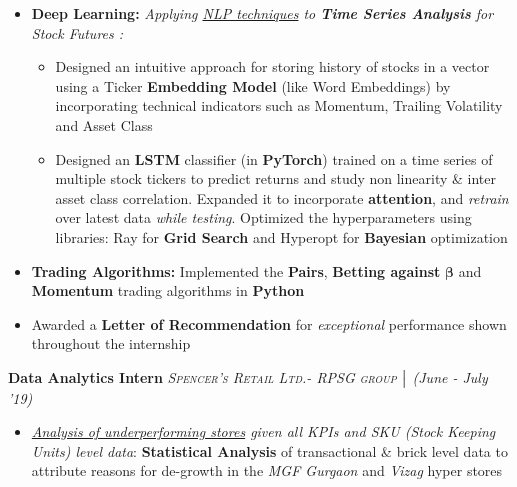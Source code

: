 \documentclass{article}
\begin{document}
\begin{itemize}[itemsep = -1 mm, leftmargin=*]
    \item \textbf{Deep Learning: }{\it Applying \underline{NLP techniques} to \textbf{Time Series Analysis} for Stock Futures :}
    \vspace{-7pt}
    \begin{itemize}[itemsep = -0.75 mm, leftmargin=*]
      \item Designed an intuitive approach for storing history of stocks in a vector using a Ticker \textbf{Embedding Model} (like Word Embeddings) by incorporating technical indicators such as Momentum, Trailing Volatility and Asset Class
     \item Designed an \textbf{LSTM} classifier (in \textbf{PyTorch}) trained on a time series of multiple stock tickers to predict returns and study non linearity \& inter asset class correlation. Expanded it to incorporate \textbf{attention}, and \textit{retrain} over latest data \textit{while testing}. Optimized the hyperparameters using libraries: Ray for \textbf{Grid Search} and Hyperopt for \textbf{Bayesian} optimization
    \end{itemize}
    \vspace{-4pt}
    \item \textbf{Trading Algorithms:} Implemented the \textbf{Pairs}, \textbf{Betting against} $\bm{\beta}$ and \textbf{Momentum} trading algorithms in \textbf{Python}
    \vspace{-1pt}
    \item Awarded a \textbf{Letter of Recommendation} for {\it exceptional} performance shown throughout the internship
\end{itemize}
\vspace{-5pt}
\textbf{Data Analytics Intern} \hfill{\sl \small \textsc{Spencer's Retail Ltd.- RPSG group} $\bigm|$ (June - July '19)}\\
\vspace{-19pt}
\begin{itemize}[itemsep = -1 mm, leftmargin=*]
    \item {\it \underline {Analysis of underperforming stores} given all KPIs and SKU (Stock Keeping Units) level data}: {\bf Statistical Analysis} of transactional \& brick level data to attribute reasons for de-growth in the {\it MGF Gurgaon} and {\it Vizag} hyper stores
\end{itemize}
\end{document}
